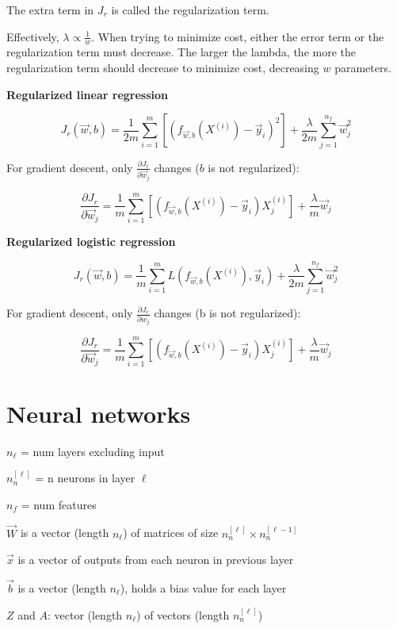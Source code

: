 \documentclass[12pt]{article}
\begin{document}
The extra term in $J_r$ is called the regularization term.

Effectively, $\lambda \propto \frac{1}{w}$. When trying to minimize cost, either the error term or the regularization term must decrease. The larger the lambda, the more the regularization term should decrease to minimize cost, decreasing $w$ parameters.

\noindent \textbf{Regularized linear regression}

\[ J_r(\vec{w},b) = \frac{1}{2m} \sum_{i=1}^m \left[(f_{\vec{w},b}(X^{(i)}) - \vec{y}_i)^2\right] + \frac{\lambda}{2m} \sum_{j=1}^{n_f} \vec{w}_j^2 \]

For gradient descent, only $\frac{\partial J_r}{\partial \vec{w}_j}$ changes ($b$ is not regularized):

\[ \frac{\partial J_r}{\partial \vec{w}_j} = \frac{1}{m} \sum_{i=1}^m \left[(f_{\vec{w},b}(X^{(i)}) - \vec{y}_i)X_j^{(i)}\right] + \frac{\lambda}{m} \vec{w}_j \]

\noindent \textbf{Regularized logistic regression}

\[ J_r(\vec{w},b) = \frac{1}{m} \sum_{i=1}^m L(f_{\vec{w},b}(X^{(i)}), \vec{y}_i) + \frac{\lambda}{2m} \sum_{j=1}^{n_f} \vec{w}_j^2 \]

For gradient descent, only $\frac{\partial J_r}{\partial w_j}$ changes (b is not regularized):

\[ \frac{\partial J_r}{\partial \vec{w}_j} = \frac{1}{m} \sum_{i=1}^m \left[(f_{\vec{w},b}(X^{(i)}) - \vec{y}_i)X_j^{(i)}\right] + \frac{\lambda}{m} \vec{w}_j \]

\pagebreak

\section{Neural networks}

$n_{\ell}$ = num layers excluding input

$n^{[\ell]}_n$ = n neurons in layer $\ell$

$n_f$ = num features

$\vec{W}$ is a vector (length $n_{\ell}$) of matrices of size $n^{[\ell]}_n \times n^{[\ell-1]}_n$

$\vec{x}$ is a vector of outputs from each neuron in previous layer

$\vec{b}$ is a vector (length $n_{\ell}$), holds a bias value for each layer

$Z$ and $A$: vector (length $n_{\ell}$) of vectors (length $n^{[\ell]}_n$)
\end{document}
